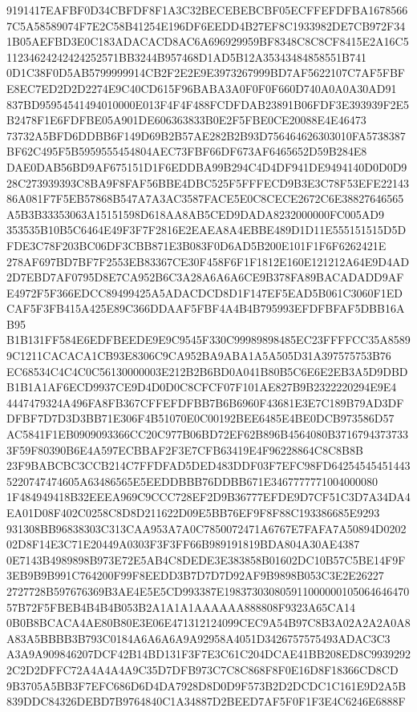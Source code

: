 \documentclass[UTF8,fontset=fandol,zihao=-4,a4paper]{ctexart}
\begin{document}
{{9191417EAFBF0D34CBFDF8F1A3C32BECEBEBCBF05ECFFEFDFBA16785667C5A58589074F7E2C58B41254E196DF6EEDD4B27EF8C1933982DE7CB972F34
1B05AEFBD3E0C183ADACACD8AC6A696929959BF8348C8C8CF8415E2A16C511234624242424252571BB3244B957468D1AD5B12A35343484858551B741
0D1C38F0D5AB5799999914CB2F2E2E9E3973267999BD7AF5622107C7AF5FBFE8EC7ED2D2D2274E9C40CD615F96BABA3A0F0F0F660D740A0A0A30AD91
837BD95954541494010000E013F4F4F488FCDFDAB23891B06FDF3E393939F2E5B2478F1E6FDFBE05A901DE606363833B0E2F5FBE0CE20088E4E46473
73732A5BFD6DDBB6F149D69B2B57AE282B2B93D756464626303010FA5738387BF62C495F5B5959555454804AEC73FBF66DF673AF6465652D59B284E8
DAE0DAB56BD9AF675151D1F6EDDBA99B294C4D4DF941DE9494140D0D0D928C273939393C8BA9F8FAF56BBE4DBC525F5FFFECD9B3E3C78F53EFE22143
86A081F7F5EB57868B547A7A3AC3587FACE5E0C8CECE2672C6E38827646565A5B3B33353063A15151598D618AA8AB5CED9DADA8232000000FC005AD9
353535B10B5C6464E49F3F7F2816E2EAEA8A4EBBE489D1D11E555151515D5DFDE3C78F203BC06DF3CBB871E3B083F0D6AD5B200E101F1F6F6262421E
278AF697BD7BF7F2553EB83367CE30F458F6F1F1812E160E121212A64E9D4AD2D7EBD7AF0795D8E7CA952B6C3A28A6A6A6CE9B378FA89BACADADD9AF
E4972F5F366EDCC89499425A5ADACDCD8D1F147EF5EAD5B061C3060F1EDCAF5F3FB415A425E89C366DDAAF5FBF4A4B4B795993EFDFBFAF5DBB16AB95
B1B131FF584E6EDFBEEDE9E9C9545F330C99989898485EC23FFFFCC35A85899C1211CACACA1CB93E8306C9CA952BA9ABA1A5A505D31A397575753B76
EC68534C4C4C0C56130000003E212B2B6BD0A041B80B5C6E6E2EB3A5D9DBDB1B1A1AF6ECD9937CE9D4D0D0C8CFCF07F101AE827B9B2322220294E9E4
4447479324A496FA8FB367CFFEFDFBB7B6B6960F43681E3E7C189B79AD3DFDFBF7D7D3D3BB71E306F4B51070E0C00192BEE6485E4BE0DCB973586D57
AC5841F1EB0909093366CC20C977B06BD72EF62B896B4564080B37167943737333F59F80390B6E4A597ECBBAF2F3E7CFB63419E4F96228864C8C8B8B
23F9BABCBC3CCB214C7FFDFAD5DED483DDF03F7EFC98FD642545454514435220747474605A63486565E5EEDDBBB76DDBB671E3467777771004000080
1F484949418B32EEEA969C9CCC728EF2D9B36777EFDE9D7CF51C3D7A34DA4EA01D08F402C0258C8D8D211622D09E5BB76EF9F8F88C193386685E9293
931308BB96838303C313CAA953A7A0C7850072471A6767E7FAFA7A50894D020202D8F14E3C71E20449A0303F3F3FF66B989191819BDA804A30AE4387
0E7143B4989898B973E72E5AB4C8DEDE3E383858B01602DC10B57C5BE14F9F3EB9B9B991C764200F99F8EEDD3B7D7D7D92AF9B9898B053C3E2E26227
2727728B597676369B3AE4E5E5CD993387E19837303080591100000010506464647057B72F5FBEB4B4B4B053B2A1A1A1AAAAAA888808F9323A65CA14
0B0B8BCACA4AE80B80E3E06E471312124099CEC9A54B97C8B3A02A2A2A0A8A83A5BBBB3B793C0184A6A6A6A9A92958A4051D3426757575493ADAC3C3
A3A9A909846207DCF42B14BD131F3F7E3C61C204DCAE41BB208ED8C99392922C2D2DFFC72A4A4A4A9C35D7DFB973C7C8C868F8F0E16D8F18366CD8CD
9B3705A5BB3F7EFC686D6D4DA7928D8D0D9F573B2D2DCDC1C161E9D2A5B839DDC84326DEBD7B9764840C1A34887D2BEED7AF5F0F1F3E4C6246E6888F
}}
\end{document}
